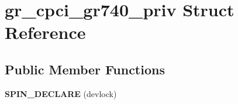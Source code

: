 \hypertarget{structgr__cpci__gr740__priv}{}\section{gr\+\_\+cpci\+\_\+gr740\+\_\+priv Struct Reference}
\label{structgr__cpci__gr740__priv}
\subsection*{Public Member Functions}
\begin{DoxyCompactItemize}
\item 
\mbox{\label{structgr__cpci__gr740__priv_a452ca135aca8f77ef9c328441d6d20a7}} 
{\bfseries S\+P\+I\+N\+\_\+\+D\+E\+C\+L\+A\+RE} (devlock)
\end{DoxyCompactItemize}
